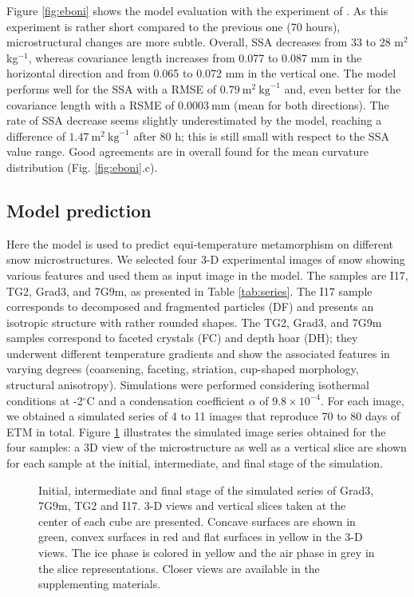 \documentclass[draft,ms]{agujournal2019}
\begin{document}
Figure \ref{fig:eboni} shows the model evaluation with the experiment of . As this experiment is rather short compared to the previous one (70 hours), microstructural changes are more subtle. Overall, SSA decreases from 33 to 28 m$^2$ kg$^{-1}$, whereas covariance length increases from 0.077 to 0.087 mm in the horizontal direction and from 0.065 to 0.072 mm in the vertical one. The model performs well for the SSA with a RMSE of $0.79\ \mathrm{m}^2\ \mathrm{kg}^{-1}$ and, even better for the covariance length with a RSME of $0.0003\ \mathrm{mm}$ (mean for both directions).
The rate of SSA decrease seems slightly underestimated by the model, reaching a difference of $1.47\ \mathrm{m}^2\ \mathrm{kg}^{-1}$ after 80 h; this is still small with respect to the SSA value range. Good agreements are in overall found for the mean curvature distribution (Fig. \ref{fig:eboni}.c). \\


\subsection{Model prediction}
\label{sec:prediction}

Here the model is used to predict equi-temperature metamorphism on different snow microstructures. We selected four 3-D experimental images of snow showing various features and used them as input image in the model. The samples are I17, TG2, Grad3, and 7G9m, as presented in Table \ref{tab:series}.
The I17 sample corresponds to decomposed and fragmented particles (DF) and presents an isotropic structure with rather rounded shapes. The TG2, Grad3, and 7G9m samples correspond to faceted crystals (FC) and depth hoar (DH); they underwent different temperature gradients and show the associated features in varying degrees (coarsening, faceting, striation, cup-shaped morphology, structural anisotropy). Simulations were performed considering isothermal conditions at -2$^\circ$C and a condensation coefficient $\alpha$ of $9.8\times 10^{-4}$. For each image, we obtained a simulated series of 4 to 11 images that reproduce 70 to 80 days of ETM in total. Figure \ref{fig:evolutions_3D} illustrates the simulated image series obtained for the four samples: a 3D view of the microstructure as well as a vertical slice are shown for each sample at the initial, intermediate, and final stage of the simulation.\\

\begin{figure}
    \centering
    \caption{Initial, intermediate and final stage of the simulated series of Grad3, 7G9m, TG2 and I17. 3-D views and vertical slices taken at the center of each cube are presented. Concave surfaces are shown in green, convex surfaces in red and flat surfaces in yellow in the 3-D views. The ice phase is colored in yellow and the air phase in grey in the slice representations. Closer views are available in the supplementing materials. }
    \label{fig:evolutions_3D}
\end{figure}
\end{document}
